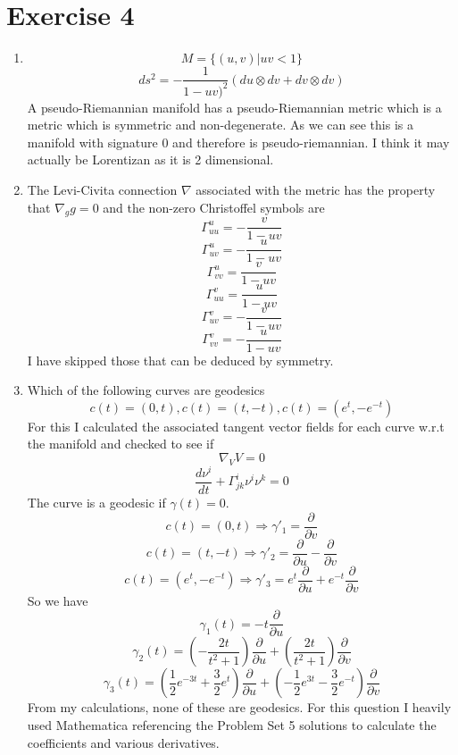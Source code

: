 \documentclass[12pt]{article}
\begin{document}
\section*{Exercise 4}
\begin{enumerate}
  \item $$ M = \{ (u,v) | uv <1 \} $$
  $$ ds^2 = - \frac{1}{1-uv)^2} ( du \otimes dv + dv \otimes dv ) $$
  A pseudo-Riemannian manifold has a pseudo-Riemannian metric which is a metric which is symmetric and non-degenerate. As we can see this is a manifold with signature 0 and therefore is pseudo-riemannian. I think it may actually be Lorentizan as it is 2 dimensional. 

  \item The Levi-Civita connection $\nabla$ associated with the metric has the property that $\nabla_g g = 0$ and the non-zero Christoffel symbols are 
  $$ \Gamma^u_{uu} = - \frac{v}{1-uv} $$
  $$ \Gamma^u_{uv} = - \frac{u}{1-uv} $$
  $$ \Gamma^u_{vv} = \frac{v}{1-uv} $$
  $$ \Gamma^v_{uu} = \frac{u}{1-uv} $$
  $$ \Gamma^v_{uv} = - \frac{v}{1-uv} $$
  $$ \Gamma^v_{vv} = - \frac{u}{1-uv} $$
  I have skipped those that can be deduced by symmetry. 
  \item Which of the following curves are geodesics 
  $$ c(t) = (0,t), c(t) = (t, -t), c(t) = (e^t, -e^{-t}) $$
  For this I calculated the associated tangent vector fields for each curve w.r.t the manifold and checked to see if 
  $$ \nabla_V V = 0 $$
  $$ \frac{d \nu^i}{dt} + \Gamma^i_{jk} \nu^i \nu^k = 0 $$
  The curve is a geodesic if $\gamma (t) =0$. 
  $$ c(t) = (0,t) \Rightarrow  \gamma'_1= \frac{\partial}{\partial v} $$
  $$ c(t) = (t, -t) \Rightarrow \gamma'_2 = \frac{\partial}{\partial u} - \frac{\partial}{\partial v} $$
  $$ c(t) = (e^t, -e^{-t}) \Rightarrow \gamma'_3 = e^t \frac{\partial}{\partial u} + e^{-t} \frac{\partial}{\partial v} $$
  So we have 
  $$ \gamma_1 (t) = -t \frac{\partial}{\partial u} $$
  $$ \gamma_2 (t) = (- \frac{2t}{t^2 +1} ) \frac{\partial}{\partial u} + (\frac{2t}{t^2 +1}) \frac{\partial}{\partial v} $$
  $$ \gamma_3 (t) = (\frac{1}{2} e^{-3t} + \frac{3}{2} e^t) \frac{\partial}{\partial u} + ( - \frac{1}{2} e^{3t} - \frac{3}{2} e^{-t} ) \frac{\partial}{\partial v} $$
  From my calculations, none of these are geodesics. For this question I heavily used Mathematica referencing the Problem Set 5 solutions to calculate the coefficients and various derivatives. 
\end{enumerate}
\end{document}
